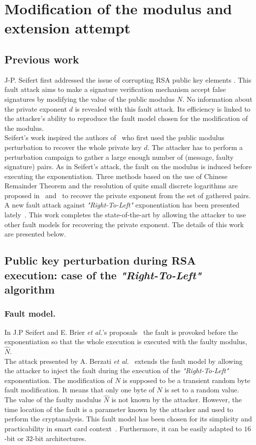 \documentclass{article}
\begin{document}
\section{Modification of the modulus and extension attempt}
\subsection{Previous work}
J-P. Seifert first addressed the issue of corrupting RSA public key elements \cite{67,13}. This fault attack 
aims to make a signature verification mechanism accept false signatures by modifying the value of the public modulus $N$. No information about the private exponent $d$ is revealed with this fault attack.
Its efficiency is linked to the attacker's ability to reproduce the fault model chosen for the modification of the modulus.\\
\indent
Seifert's work inspired the authors of~\cite{6} who first used the public modulus perturbation to recover the whole private key $d$. The attacker has to perform a perturbation campaign to gather a large enough number of (message, faulty signature) pairs. As in Seifert's attack, the fault on the modulus is induced before executing the exponentiation. Three methods based on the use of Chinese Remainder Theorem and the resolution of quite small discrete logarithms are proposed in~\cite{6} and~\cite{59} to recover the private exponent from the set of gathered pairs.\\
\indent
A new fault attack against \textit{"Right-To-Left"} exponentiation has been presented lately~\cite{77}.
This work completes the state-of-the-art by allowing the attacker to use other fault models for recovering the private exponent. The details of this work are presented below.

\subsection{Public key perturbation during RSA execution: case of the \textit{"Right-To-Left"} algorithm}

\subsubsection{Fault model.}
In J.P Seifert and E. Brier \textit{et al.}'s proposals~\cite{67,6} the fault is provoked before the exponentiation so that the whole execution is executed with the faulty modulus, $\hat{N}$.\\
The attack presented by A. Berzati \textit{et al.}~\cite{77} extends the fault model by allowing the attacker to inject the fault during the execution of the \textit{"Right-To-Left"} exponentiation. The modification of $N$ is supposed to be a transient random byte fault modification. It means that only one byte of $N$ is set to a random value. The value of the faulty modulus $\hat{N}$ is not known by the attacker.
However, the time location of the fault is a parameter known by the attacker and used to perform the cryptanalysis. This fault model has been chosen for its simplicity and practicability in smart card context~\cite{25,7}. Furthermore, it can be easily adapted to $16$-bit or $32$-bit architectures. 
\end{document}
